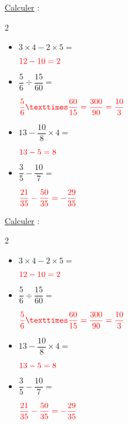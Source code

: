 \documentclass{automatisme}
\begin{document}
\newcommand{\Calculs}{
	\begin{frame}
		\uline{Calculer} :

		\begin{multicols}{2}
			\begin{itemize}
				\item $3 × 4 - 2 × 5 = $\vspace{0.5em}

				      $\correction{12 - 10 = 2}$\vspace{2em}
				\item $\dfrac{5}{6} ÷ \dfrac{15}{60} =$\vspace{0.5em}

				      $\correction{\dfrac{5}{6} × \dfrac{60}{15} = \dfrac{300}{90} = \dfrac{10}{3}}$
				\item $13 - \dfrac{10}{8} × 4 =$\vspace{0.5em}

				      $\correction{13 - 5 = 8}$\vspace{1em}
				\item $\dfrac{3}{5} - \dfrac{10}{7} =$\vspace{0.5em}

				      $\correction{\dfrac{21}{35} - \dfrac{50}{35} = -\dfrac{29}{35}}$
			\end{itemize}
		\end{multicols}
	\end{frame}
}

\Calculs

\newcommand{\makeCorrection}{}
\Calculs
\end{document}
